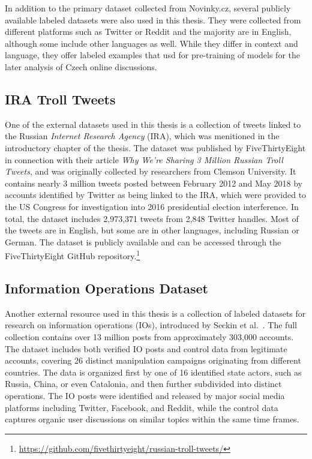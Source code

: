 \documentclass[twoside]{ctuthesis}
\theoremstyle{plain}
\theoremstyle{definition}
\theoremstyle{note}
\begin{document}
In addition to the primary dataset collected from Novinky.cz, several publicly available labeled datasets were also used in this thesis. They were collected from different platforms such as Twitter or Reddit and the majority are in English, although some include other languages as well. While they differ in context and language, they offer labeled examples that usd for pre-training of models for the later analysis of Czech online discussions.\par

\subsection{IRA Troll Tweets}
One of the external datasets used in this thesis is a collection of tweets linked to the Russian \textit{Internet Research Agency} (IRA), which was menitioned in the introductory chapter of the thesis. The dataset was published by FiveThirtyEight in connection with their article \textit{Why We're Sharing 3 Million Russian Troll Tweets}, and was originally collected by researchers from Clemson University. It contains nearly 3 million tweets posted between February 2012 and May 2018 by accounts identified by Twitter as being linked to the IRA, which were provided to the US Congress for investigation into 2016 presidential election interference. In total, the dataset includes 2,973,371 tweets from 2,848 Twitter handles. Most of the tweets are in English, but some are in other languages, including Russian or German. The dataset is publicly available and can be accessed through the FiveThirtyEight GitHub repository.\footnote{\url{https://github.com/fivethirtyeight/russian-troll-tweets/}}

\subsection{Information Operations Dataset}
Another external resource used in this thesis is a collection of labeled datasets for research on information operations (IOs), introduced by Seckin et al.~\cite{Seckin2024}. The full collection contains over 13 million posts from approximately 303,000 accounts. The dataset includes both verified IO posts and control data from legitimate accounts, covering 26 distinct manipulation campaigns originating from different countries. The data is organized first by one of 16 identified state actors, such as Russia, China, or even Catalonia, and then further subdivided into distinct operations. The IO posts were identified and released by major social media platforms including Twitter, Facebook, and Reddit, while the control data captures organic user discussions on similar topics within the same time frames.
\end{document}
